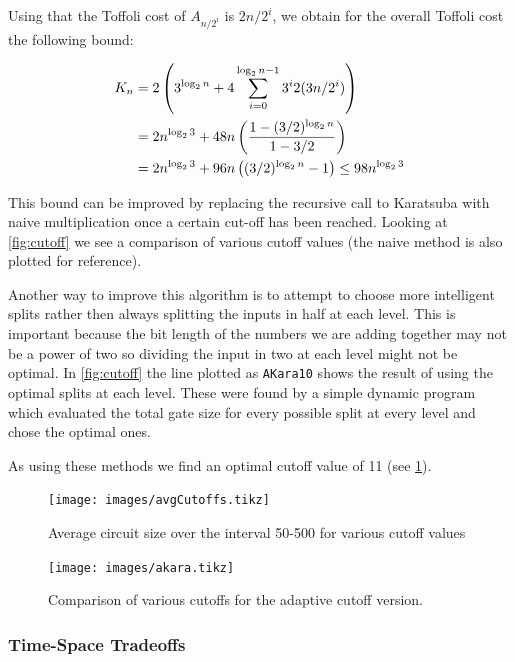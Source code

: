       Using that the Toffoli cost of $A_{n/2^i}$ is $2n/2^i$, we obtain for
      the overall Toffoli cost the following bound:

      \begin{align}
        K_n &= 2\left(3^{\log_2 n } + 4 \sum_{i=0}^{\log_2 n - 1} 3^i 2(3n/2^i)\right)\notag\\
            &= 2n^{\log_2 3} + 48n \left(\frac{1- (3/2)^{\log_2 n}}{1-3/2}\right) \notag\\
            &= 2n^{\log_2 3} + 96n \left((3/2)^{\log_2{n}} -1\right) \leq 98 n^{\log_2{3}}
      \end{align}

      This bound can be improved by replacing the recursive call to Karatsuba
      with naive multiplication once a certain cut-off has been reached.
      Looking at \cref{fig:cutoff} we see a comparison of various cutoff values
      (the naive method is also plotted for reference).

      Another way to improve this algorithm is to attempt to choose more
      intelligent splits rather then always splitting the inputs in half at
      each level.  This is important because the bit length of the numbers we
      are adding together may not be a power of two so dividing the input in
      two at each level might not be optimal.  In \cref{fig:cutoff} the line
      plotted as \verb+AKara10+ shows the result of using the optimal splits at
      each level.  These were found by a simple dynamic program which evaluated
      the total gate size for every possible split at every level and chose the
      optimal ones.

      As using these methods we find an optimal cutoff value of 11 (see
      \cref{fig:cutoffs}).

      \begin{figure}[p]
        \capstart
        \texttt{[image: images/avgCutoffs.tikz]}
        \caption{Average circuit size over the interval 50-500 for various cutoff values}
        \label{fig:cutoffs}
      \end{figure}
      \begin{figure}[p]
        \capstart
        \texttt{[image: images/akara.tikz]}
        \caption{Comparison of various cutoffs for the adaptive cutoff version.}
        \label{fig:aKara}
     \end{figure}

\subsubsection{Time-Space Tradeoffs}

